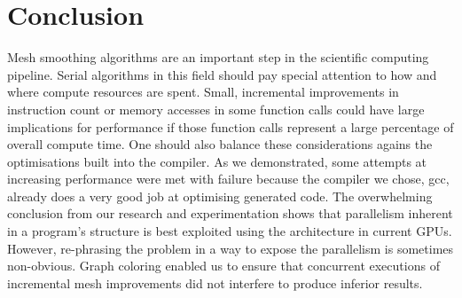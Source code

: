 \documentclass[a4paper,11pt, twocolumn]{article}
\begin{document}
\section{Conclusion}
Mesh smoothing algorithms are an important step in the scientific computing pipeline.  Serial algorithms in this field  should pay special attention to how and where compute resources are spent.  Small, incremental improvements in instruction count or memory accesses in some function calls could have large implications for performance if those function calls represent a large percentage of overall compute time.  One should also balance these considerations agains the optimisations built into the compiler.  As we demonstrated, some attempts at increasing performance were met with failure because the compiler we chose, gcc, already does a very good job at optimising generated code.  The overwhelming conclusion from our research and experimentation shows that parallelism inherent in a program's structure is best exploited using the architecture in current GPUs.  However, re-phrasing the problem in a way to expose the parallelism is sometimes non-obvious.  Graph coloring enabled us to ensure that concurrent executions of incremental mesh improvements did not interfere to produce inferior results.

\end{document}
